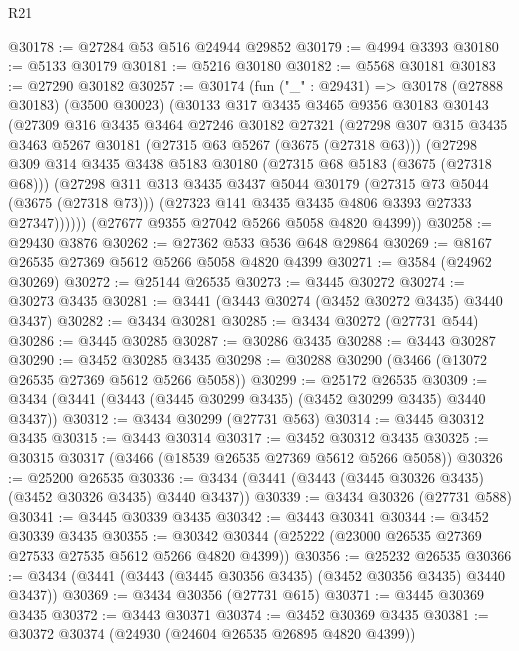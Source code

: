 \begin{lexlean}{R21}
\begin{coremodule}
@30178 := @27284 @53 @516 @24944 @29852
@30179 := @4994 @3393
@30180 := @5133 @30179
@30181 := @5216 @30180
@30182 := @5568 @30181
@30183 := @27290 @30182
@30257 := @30174
    (fun ("_" : @29431) =>
    @30178
      (@27888 @30183)
      (@3500 @30023)
      (@30133
        @317
        @3435
        @3465
        @9356
        @30183
        @30143
        (@27309
          @316
          @3435
          @3464
          @27246
          @30182
          @27321
          (@27298
            @307
            @315
            @3435
            @3463
            @5267
            @30181
            (@27315 @63 @5267 (@3675 (@27318 @63)))
            (@27298
              @309
              @314
              @3435
              @3438
              @5183
              @30180
              (@27315 @68 @5183 (@3675 (@27318 @68)))
              (@27298
                @311
                @313
                @3435
                @3437
                @5044
                @30179
                (@27315 @73 @5044 (@3675 (@27318 @73)))
                (@27323 @141 @3435 @3435 @4806 @3393 @27333 @27347))))))
      (@27677 @9355 @27042 @5266 @5058 @4820 @4399))
@30258 := @29430 @3876
@30262 := @27362 @533 @536 @648 @29864
@30269 := @8167 @26535 @27369 @5612 @5266 @5058 @4820 @4399
@30271 := @3584 (@24962 @30269)
@30272 := @25144 @26535
@30273 := @3445 @30272
@30274 := @30273 @3435
@30281 := @3441 (@3443 @30274 (@3452 @30272 @3435) @3440 @3437)
@30282 := @3434 @30281
@30285 := @3434 @30272 (@27731 @544)
@30286 := @3445 @30285
@30287 := @30286 @3435
@30288 := @3443 @30287
@30290 := @3452 @30285 @3435
@30298 := @30288 @30290 (@3466 (@13072 @26535 @27369 @5612 @5266 @5058))
@30299 := @25172 @26535
@30309 := @3434 (@3441 (@3443 (@3445 @30299 @3435) (@3452 @30299 @3435) @3440 @3437))
@30312 := @3434 @30299 (@27731 @563)
@30314 := @3445 @30312 @3435
@30315 := @3443 @30314
@30317 := @3452 @30312 @3435
@30325 := @30315 @30317 (@3466 (@18539 @26535 @27369 @5612 @5266 @5058))
@30326 := @25200 @26535
@30336 := @3434 (@3441 (@3443 (@3445 @30326 @3435) (@3452 @30326 @3435) @3440 @3437))
@30339 := @3434 @30326 (@27731 @588)
@30341 := @3445 @30339 @3435
@30342 := @3443 @30341
@30344 := @3452 @30339 @3435
@30355 := @30342 @30344 (@25222 (@23000 @26535 @27369 @27533 @27535 @5612 @5266 @4820 @4399))
@30356 := @25232 @26535
@30366 := @3434 (@3441 (@3443 (@3445 @30356 @3435) (@3452 @30356 @3435) @3440 @3437))
@30369 := @3434 @30356 (@27731 @615)
@30371 := @3445 @30369 @3435
@30372 := @3443 @30371
@30374 := @3452 @30369 @3435
@30381 := @30372 @30374 (@24930 (@24604 @26535 @26895 @4820 @4399))

\end{coremodule}
\end{lexlean}
